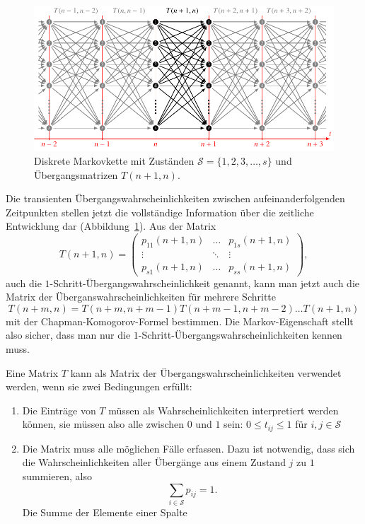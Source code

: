 \begin{figure}
\centering
\includegraphics{chapters/80-wahrscheinlichkeit/images/markov.pdf}
\caption{Diskrete Markovkette mit Zuständen $\mathcal{S}=\{1,2,3,\dots,s\}$
und Übergangsmatrizen $T(n+1,n)$.
\label{buch:wahrscheinlichkeit:fig:diskretemarkovkette}}
\end{figure}

Die transienten Übergangswahrscheinlichkeiten zwischen aufeinanderfolgenden
Zeitpunkten stellen jetzt die vollständige Information über die
zeitliche Entwicklung dar
(Abbildung~\ref{buch:wahrscheinlichkeit:fig:diskretemarkovkette}).
Aus der Matrix
\[
T(n+1,n)
=
\begin{pmatrix}
p_{11}(n+1,n) & \dots  & p_{1s}(n+1,n)\\
\vdots        & \ddots & \vdots       \\
p_{s1}(n+1,n) & \dots  & p_{ss}(n+1,n)
\end{pmatrix},
\]
auch die $1$-Schritt-Übergangswahrscheinlichkeit genannt, kann man jetzt
auch die Matrix der Überganswahrscheinlichkeiten für mehrere Schritte
%
\[
T(n+m,n)
=
T(n+m,n+m-1)
T(n+m-1,n+m-2)
\dots
T(n+1,n)
\]
mit der Chapman-Komogorov-Formel bestimmen.
Die Markov-Eigenschaft stellt also sicher, dass man nur die 
$1$-Schritt-Übergangswahrscheinlichkeiten kennen muss.

Eine Matrix $T$ kann als Matrix der Übergangswahrscheinlichkeiten
verwendet werden, wenn sie zwei Bedingungen erfüllt:
\begin{enumerate}
\item Die Einträge von $T$ müssen als Wahrscheinlichkeiten interpretiert
werden können, sie müssen also alle zwischen $0$ und $1$ sein:
$0\le t_{i\!j}\le 1$ für $i,j\in\mathcal{S}$
\item Die Matrix muss alle möglichen Fälle erfassen.
Dazu ist notwendig, dass sich die Wahrscheinlichkeiten aller Übergänge
aus einem Zustand $j$ zu $1$ summieren, also
\[
\sum_{i\in\mathcal{S}} p_{i\!j} = 1.
\]
Die Summe der Elemente einer Spalte 
\end{enumerate}

